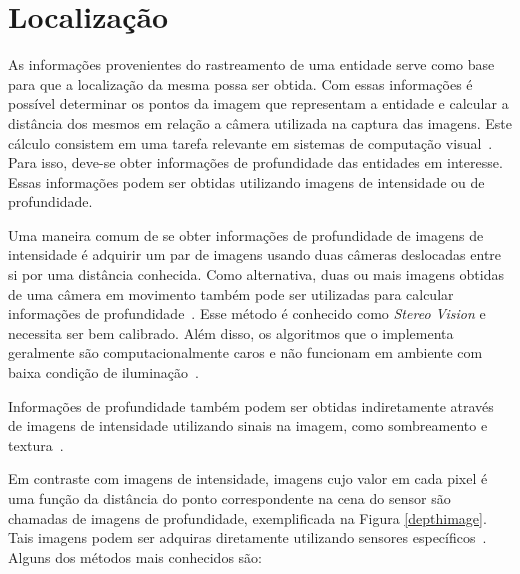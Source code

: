 \section{Localização}
\label{sec:luz-estruturada}

	As informações provenientes do rastreamento de uma entidade serve como base para que a localização da mesma possa ser obtida. Com essas informações é possível determinar os pontos da imagem que representam a entidade e calcular a distância dos mesmos em relação a câmera utilizada na captura das imagens. Este cálculo consistem em uma tarefa relevante em sistemas de computação visual~\cite{jain}. Para isso,
	deve-se obter informações de profundidade das entidades em interesse. Essas
	informações podem ser obtidas utilizando imagens de intensidade ou de
	profundidade.
	
	Uma maneira comum de se obter informações de profundidade de imagens de
	intensidade é adquirir um par de imagens usando duas câmeras deslocadas entre si
	por uma distância conhecida. Como alternativa, duas ou mais imagens obtidas de
	uma câmera em movimento também pode ser utilizadas para calcular informações de
	profundidade~\cite{jain}. Esse método é conhecido como \textit{Stereo Vision} e
	necessita ser bem calibrado.  Além disso, os algoritmos que o implementa
	geralmente são computacionalmente caros e não funcionam em ambiente com baixa
	condição de iluminação~\cite{fall-detection}.
	
	Informações de profundidade também podem ser obtidas indiretamente através de
	imagens de intensidade utilizando sinais na imagem, como sombreamento e
	textura~\cite{jain}.
	
	Em contraste com imagens de intensidade, imagens cujo valor em cada pixel é uma
	função da distância do ponto correspondente na cena do sensor são chamadas de
	imagens de profundidade, exemplificada na Figura \ref{depthimage}. Tais imagens
	podem ser adquiras diretamente utilizando sensores específicos~\cite{jain}.
	Alguns dos métodos mais conhecidos são:

